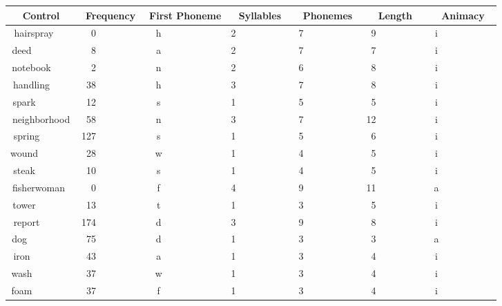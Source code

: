 %
\setlongtables
\begin{longtable}{|c|c|c|c|c|c|c|}
\hline
\multicolumn{1}{|c|}{Control}&\multicolumn{1}{c|}{Frequency}&\multicolumn{1}{c|}{First Phoneme}&\multicolumn{1}{c|}{Syllables}&\multicolumn{1}{c|}{Phonemes}&\multicolumn{1}{c|}{Length}&\multicolumn{1}{c|}{Animacy}\\ \hline
\endhead
\hline\endfoot
hairspray~~~&~~0~~~~~~~~~&h~~~~~~~~~~~&2~~~~~~~~~~~&7~~~~~~~~~~~&~9~~~~~~~~~~&i~~~~~~~~~~~\\ 
deed~~~~~~~~&~~8~~~~~~~~~&a~~~~~~~~~~~&2~~~~~~~~~~~&7~~~~~~~~~~~&~7~~~~~~~~~~&i~~~~~~~~~~~\\ 
notebook~~~~&~~2~~~~~~~~~&n~~~~~~~~~~~&2~~~~~~~~~~~&6~~~~~~~~~~~&~8~~~~~~~~~~&i~~~~~~~~~~~\\ 
handling~~~~&~38~~~~~~~~~&h~~~~~~~~~~~&3~~~~~~~~~~~&7~~~~~~~~~~~&~8~~~~~~~~~~&i~~~~~~~~~~~\\ 
spark~~~~~~~&~12~~~~~~~~~&s~~~~~~~~~~~&1~~~~~~~~~~~&5~~~~~~~~~~~&~5~~~~~~~~~~&i~~~~~~~~~~~\\ 
neighborhood&~58~~~~~~~~~&n~~~~~~~~~~~&3~~~~~~~~~~~&7~~~~~~~~~~~&12~~~~~~~~~~&i~~~~~~~~~~~\\ 
spring~~~~~~&127~~~~~~~~~&s~~~~~~~~~~~&1~~~~~~~~~~~&5~~~~~~~~~~~&~6~~~~~~~~~~&i~~~~~~~~~~~\\ 
wound~~~~~~~&~28~~~~~~~~~&w~~~~~~~~~~~&1~~~~~~~~~~~&4~~~~~~~~~~~&~5~~~~~~~~~~&i~~~~~~~~~~~\\ 
steak~~~~~~~&~10~~~~~~~~~&s~~~~~~~~~~~&1~~~~~~~~~~~&4~~~~~~~~~~~&~5~~~~~~~~~~&i~~~~~~~~~~~\\ 
fisherwoman~&~~0~~~~~~~~~&f~~~~~~~~~~~&4~~~~~~~~~~~&9~~~~~~~~~~~&11~~~~~~~~~~&a~~~~~~~~~~~\\ 
tower~~~~~~~&~13~~~~~~~~~&t~~~~~~~~~~~&1~~~~~~~~~~~&3~~~~~~~~~~~&~5~~~~~~~~~~&i~~~~~~~~~~~\\ 
report~~~~~~&174~~~~~~~~~&d~~~~~~~~~~~&3~~~~~~~~~~~&9~~~~~~~~~~~&~8~~~~~~~~~~&i~~~~~~~~~~~\\ 
dog~~~~~~~~~&~75~~~~~~~~~&d~~~~~~~~~~~&1~~~~~~~~~~~&3~~~~~~~~~~~&~3~~~~~~~~~~&a~~~~~~~~~~~\\ 
iron~~~~~~~~&~43~~~~~~~~~&a~~~~~~~~~~~&1~~~~~~~~~~~&3~~~~~~~~~~~&~4~~~~~~~~~~&i~~~~~~~~~~~\\ 
wash~~~~~~~~&~37~~~~~~~~~&w~~~~~~~~~~~&1~~~~~~~~~~~&3~~~~~~~~~~~&~4~~~~~~~~~~&i~~~~~~~~~~~\\ 
foam~~~~~~~~&~37~~~~~~~~~&f~~~~~~~~~~~&1~~~~~~~~~~~&3~~~~~~~~~~~&~4~~~~~~~~~~&i~~~~~~~~~~~\\ 

\end{longtable}
